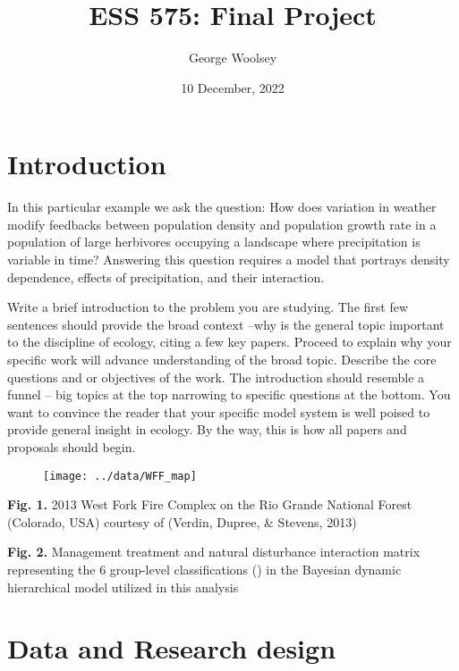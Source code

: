 \documentclass[
]{article}
\title{ESS 575: Final Project}
\author{George Woolsey}
\date{10 December, 2022}
\begin{document}
\maketitle

\hypertarget{introduction}{%
\section{Introduction}\label{introduction}}

In this particular example we ask the question: How does variation in
weather modify feedbacks between population density and population
growth rate in a population of large herbivores occupying a landscape
where precipitation is variable in time? Answering this question
requires a model that portrays density dependence, effects of
precipitation, and their interaction.

Write a brief introduction to the problem you are studying. The first
few sentences should provide the broad context --why is the general
topic important to the discipline of ecology, citing a few key papers.
Proceed to explain why your specific work will advance understanding of
the broad topic. Describe the core questions and or objectives of the
work. The introduction should resemble a funnel -- big topics at the top
narrowing to specific questions at the bottom. You want to convince the
reader that your specific model system is well poised to provide general
insight in ecology. By the way, this is how all papers and proposals
should begin.

\begin{figure}

{\centering \texttt{[image: ../data/WFF\_map]} 

}

\end{figure}

\textbf{Fig. 1.} 2013 West Fork Fire Complex on the Rio Grande National
Forest (Colorado, USA) courtesy of (Verdin, Dupree, \& Stevens, 2013)

\textbf{Fig. 2.} Management treatment and natural disturbance
interaction matrix representing the 6 group-level classifications () in
the Bayesian dynamic hierarchical model utilized in this analysis

\hypertarget{data-and-research-design}{%
\section{Data and Research design}\label{data-and-research-design}}
\end{document}
